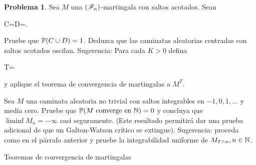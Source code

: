 \documentclass[a5paper,oneside]{amsart}
\theoremstyle{plain}
\theoremstyle{definition}
\newtheorem{problema}{Problema}
\begin{document}
\begin{problema}
Sea $M$ una $\left( \mathscr{F}_n\right) $-martingala con saltos acotados. Sean\begin{esn}
C=\quad{}\quad D=.
\end{esn}Pruebe que $\mathbb{P}\! \left( C\cup D \right)=1$. Deduzca que las caminatas aleatorias centradas con saltos acotados oscilan. Sugerencia: Para cada $K>0$ defina\begin{esn}
T=\min{}
\end{esn}y aplique el teorema de convergencia de martingalas a $M^T$. 

Sea $M$ una caminata aleatoria no trivial con saltos integrables en $-1,0,1,\ldots$ y  media cero. Pruebe que $\mathbb{P}\! \left( M\text{ converge en }\mathbb{N} \right)=0$ y  concluya que $\liminf M_n=-\infty$ casi seguramente. (Este resultado permitir\'a dar una prueba adicional de que un Galton-Watson cr\'itico se extingue).  Sugerencia: proceda como en el p\'arrafo anterior y pruebe la integrabilidad uniforme de $M_{T\wedge n},n\in\mathbb{N}$.

 Teoremas de convergencia de martingalas
\end{problema}
\end{document}
